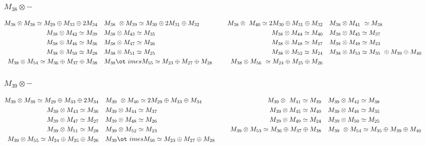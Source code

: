 \subsubsection{$M_38\otimes -$}
\begin{align*}
M_{38} \otimes M_{38} \simeq M_{29} \oplus M_{33} \oplus 2 M_{34} &&& M_{38} \
\otimes M_{39} \simeq M_{30} \oplus 2 M_{31} \oplus M_{32} &&& M_{38} \otimes \
M_{40} \simeq 2 M_{30} \oplus M_{31} \oplus M_{32} &&& M_{38} \otimes M_{41} \
\simeq M_{38}\\
M_{38} \otimes M_{42} \simeq M_{39} &&& M_{38} \otimes M_{43} \simeq M_{35} &&\
& M_{38} \otimes M_{44} \simeq M_{40} &&& M_{38} \otimes M_{45} \simeq M_{37}\
\\
M_{38} \otimes M_{46} \simeq M_{36} &&& M_{38} \otimes M_{47} \simeq M_{26} &&\
& M_{38} \otimes M_{48} \simeq M_{27} &&& M_{38} \otimes M_{49} \simeq M_{23}\
\\
M_{38} \otimes M_{50} \simeq M_{28} &&& M_{38} \otimes M_{51} \simeq M_{25} &&\
& M_{38} \otimes M_{52} \simeq M_{24} &&& M_{38} \otimes M_{53} \simeq M_{35} \
\oplus M_{39} \oplus M_{40}\\
M_{38} \otimes M_{54} \simeq M_{36} \oplus M_{37} \oplus M_{38} &&& M_{38} \ot\
imes M_{55} \simeq M_{23} \oplus M_{27} \oplus M_{28} &&& M_{38} \otimes M_{56\
} \simeq M_{24} \oplus M_{25} \oplus M_{26}\\
\end{align*}

\subsubsection{$M_39\otimes -$}
\begin{align*}
M_{39} \otimes M_{39} \simeq M_{29} \oplus M_{33} \oplus 2 M_{34} &&& M_{39} \
\otimes M_{40} \simeq 2 M_{29} \oplus M_{33} \oplus M_{34} &&& M_{39} \otimes \
M_{41} \simeq M_{39} &&& M_{39} \otimes M_{42} \simeq M_{38}\\
M_{39} \otimes M_{43} \simeq M_{36} &&& M_{39} \otimes M_{44} \simeq M_{37} &&\
& M_{39} \otimes M_{45} \simeq M_{40} &&& M_{39} \otimes M_{46} \simeq M_{35}\
\\
M_{39} \otimes M_{47} \simeq M_{27} &&& M_{39} \otimes M_{48} \simeq M_{26} &&\
& M_{39} \otimes M_{49} \simeq M_{24} &&& M_{39} \otimes M_{50} \simeq M_{25}\
\\
M_{39} \otimes M_{51} \simeq M_{28} &&& M_{39} \otimes M_{52} \simeq M_{23} &&\
& M_{39} \otimes M_{53} \simeq M_{36} \oplus M_{37} \oplus M_{38} &&& M_{39} \
\otimes M_{54} \simeq M_{35} \oplus M_{39} \oplus M_{40}\\
M_{39} \otimes M_{55} \simeq M_{24} \oplus M_{25} \oplus M_{26} &&& M_{39} \ot\
imes M_{56} \simeq M_{23} \oplus M_{27} \oplus M_{28}\\
\end{align*}

